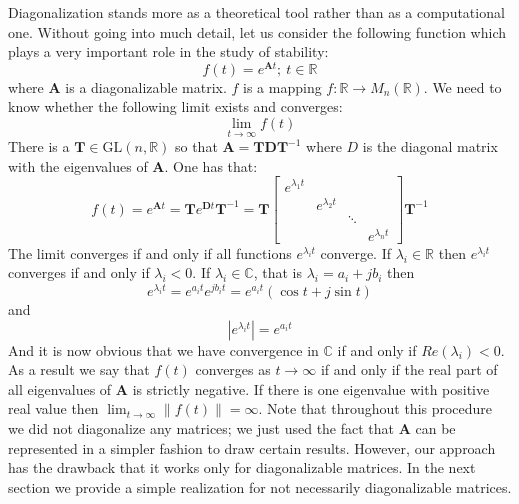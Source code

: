 \documentclass[a4paper,10pt,oneside]{book}
\begin{document}
Diagonalization stands more as a theoretical tool rather than as a computational one. 
Without going into much detail, let us consider the following function which plays 
a very important role in the study of stability:
\begin{equation}
 f(t)=e^{\mathbf{A}t};\ t\in \mathbb{R}
\end{equation}
where $\mathbf{A}$ is a diagonalizable matrix. $f$ is a mapping $f:\mathbb{R}\rightarrow M_n(\mathbb{R})$. We need to know whether the following limit exists and converges:
\begin{equation}
 \lim_{t\to \infty}f(t)
\end{equation}
There is a $\mathbf{T}\in\text{GL}(n,\mathbb{R})$ so that $\mathbf{A}=\mathbf{TDT}^{-1}$ where $D$ is the diagonal matrix with the eigenvalues of $\mathbf{A}$. One has that:
\begin{equation}
 f(t)=e^{\mathbf{A}t}=\mathbf{T}e^{\mathbf{D}t}\mathbf{T}^{-1}=\mathbf{T}
\left[ {\begin{array}{cccc} 
e^{\lambda_1 t}\\  & e^{\lambda_2 t} \\ && \ddots \\ &&& e^{\lambda_n t} \end{array} } \right] \mathbf{T}^{-1}
\end{equation}
The limit converges if and only if all functions $e^{\lambda_i t}$ converge. If $\lambda_i \in \mathbb{R}$ then $e^{\lambda_i t}$ converges if and only if $\lambda_i<0$. If $\lambda_i\in\mathbb{C}$, that is $\lambda_i=a_i+jb_i$ then
\begin{equation}
 e^{\lambda_i t}=e^{a_i t}e^{jb_i t} = e^{a_i t} (\cos t + j \sin t)
\end{equation}
and 
\begin{equation}
 \left| e^{\lambda_i t} \right| = e^{a_i t} 
\end{equation}
And it is now obvious that we have convergence in $\mathbb{C}$ if and only if $Re(\lambda_i)<0$. As a result we say that $f(t)$ converges as $t\to\infty$ if and only if the real part of all eigenvalues of $\mathbf{A}$ is strictly negative. If there is one eigenvalue with positive real value then $\lim_{t\to\infty}\|f(t)\|=\infty$. Note that throughout this procedure we did not diagonalize any matrices; we just used the fact that $\mathbf{A}$ can be represented in a simpler fashion to draw certain results. However, our approach has the drawback that it works only for diagonalizable matrices. In the next section we provide a simple realization for not necessarily diagonalizable matrices.
\end{document}
